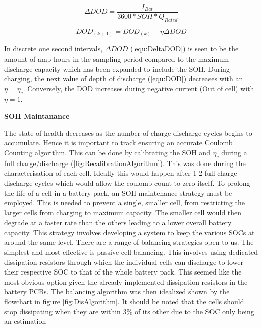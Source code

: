 \documentclass[10pt,twoside]{article}
\begin{document}
\noindent\begin{minipage}{.49\linewidth}
\begin{equation}
    \Delta DOD = \frac{I_{Bat}}{3600*SOH*Q_{Rated}}
  \label{equ:DeltaDOD}
\end{equation}
\end{minipage}
\begin{minipage}{.49\linewidth}
\begin{equation}
    DOD_{(k+1)} = DOD_{(k)} - \eta\Delta DOD
  \label{equ:DOD}
\end{equation}
\end{minipage}

In discrete one second intervals, $\Delta DOD$ (\ref{equ:DeltaDOD}) is seen to be the amount of amp-hours in the sampling period compared to the maximum discharge capacity which has been expanded to include the SOH. During charging, the next value of depth of discharge (\ref{equ:DOD}) decreases with an $\eta = \eta_c$. Conversely, the DOD increases during negative current (Out of cell) with $\eta=1$.

\textbf{SOH Maintanance}

The state of health decreases as the number of charge-discharge cycles begins to accumulate. Hence it is important to track ensuring an accurate Coulomb Counting algorithm. This can be done by calibrating the SOH and $\eta_c$ during a full charge/discharge (\ref{fig:RecalibrationAlgorithm}). This was done during the characterisation of each cell. Ideally this would happen after 1-2 full charge-discharge cycles which would allow the coulomb count to zero itself. To prolong the life of a cell in a battery pack, an SOH maintenance strategy must be employed. This is needed to prevent a single, smaller cell, from restricting the larger cells from charging to maximum capacity. The smaller cell would then degrade at a faster rate than the others leading to a lower overall battery capacity. This strategy involves developing a system to keep the various SOCs at around the same level. There are a range of balancing strategies open to us. The simplest and most effective is passive cell balancing. This involves using dedicated dissipation resistors through which the individual cells can discharge to lower their respective SOC to that of the whole battery pack. This seemed like the most obvious option given the already implemented dissipation resistors in the battery PCBs. The balancing algorithm was then idealized shown by the flowchart in figure \ref{fig:DisAlgorithm}. It should be noted that the cells should stop dissipating when they are within 3\% of its other due to the SOC only being an estimation
\end{document}
